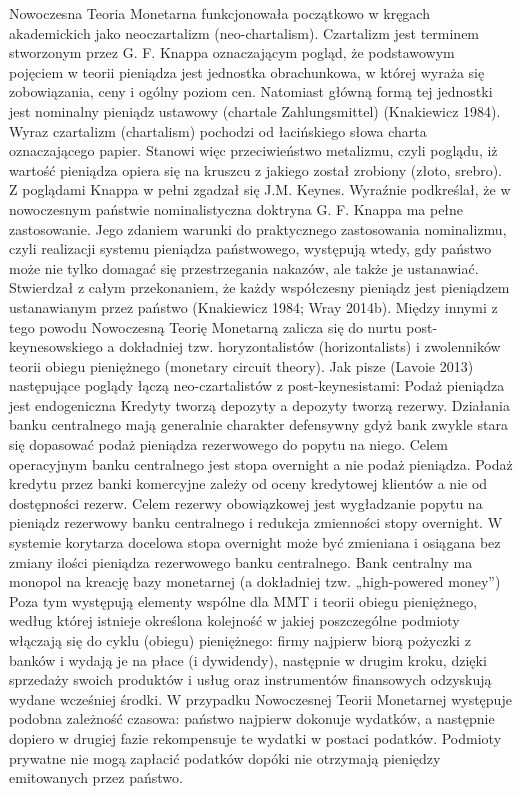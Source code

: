 \documentclass[
]{book}
\begin{document}
Nowoczesna Teoria Monetarna funkcjonowała początkowo w kręgach akademickich jako neoczartalizm (neo-chartalism). Czartalizm jest terminem stworzonym przez G. F. Knappa oznaczającym pogląd, że podstawowym pojęciem w teorii pieniądza jest jednostka obrachunkowa, w której wyraża się zobowiązania, ceny i ogólny poziom cen. Natomiast główną formą tej jednostki jest nominalny pieniądz ustawowy (chartale Zahlungsmittel) (Knakiewicz 1984). Wyraz czartalizm (chartalism) pochodzi od łacińskiego słowa charta oznaczającego papier. Stanowi więc przeciwieństwo metalizmu, czyli poglądu, iż wartość pieniądza opiera się na kruszcu z jakiego został zrobiony (złoto, srebro). Z poglądami Knappa w pełni zgadzał się J.M. Keynes. Wyraźnie podkreślał, że w nowoczesnym państwie nominalistyczna doktryna G. F. Knappa ma pełne zastosowanie. Jego zdaniem warunki do praktycznego zastosowania nominalizmu, czyli realizacji systemu pieniądza państwowego, występują wtedy, gdy państwo może nie tylko domagać się przestrzegania nakazów, ale także je ustanawiać. Stwierdzał z całym przekonaniem, że każdy współczesny pieniądz jest pieniądzem ustanawianym przez państwo (Knakiewicz 1984; Wray 2014b). Między innymi z tego powodu Nowoczesną Teorię Monetarną zalicza się do nurtu post-keynesowskiego a dokładniej tzw. horyzontalistów (horizontalists) i zwolenników teorii obiegu pieniężnego (monetary circuit theory). Jak pisze (Lavoie 2013) następujące poglądy łączą neo-czartalistów z post-keynesistami:
Podaż pieniądza jest endogeniczna
Kredyty tworzą depozyty a depozyty tworzą rezerwy.
Działania banku centralnego mają generalnie charakter defensywny gdyż bank zwykle stara się dopasować podaż pieniądza rezerwowego do popytu na niego.
Celem operacyjnym banku centralnego jest stopa overnight a nie podaż pieniądza.
Podaż kredytu przez banki komercyjne zależy od oceny kredytowej klientów a nie od dostępności rezerw.
Celem rezerwy obowiązkowej jest wygładzanie popytu na pieniądz rezerwowy banku centralnego i redukcja zmienności stopy overnight.
W systemie korytarza docelowa stopa overnight może być zmieniana i osiągana bez zmiany ilości pieniądza rezerwowego banku centralnego.
Bank centralny ma monopol na kreację bazy monetarnej (a dokładniej tzw. „high-powered money'')
Poza tym występują elementy wspólne dla MMT i teorii obiegu pieniężnego, według której istnieje określona kolejność w jakiej poszczególne podmioty włączają się do cyklu (obiegu) pieniężnego: firmy najpierw biorą pożyczki z banków i wydają je na płace (i dywidendy), następnie w drugim kroku, dzięki sprzedaży swoich produktów i usług oraz instrumentów finansowych odzyskują wydane wcześniej środki. W przypadku Nowoczesnej Teorii Monetarnej występuje podobna zależność czasowa: państwo najpierw dokonuje wydatków, a następnie dopiero w drugiej fazie rekompensuje te wydatki w postaci podatków. Podmioty prywatne nie mogą zapłacić podatków dopóki nie otrzymają pieniędzy emitowanych przez państwo.
\end{document}
